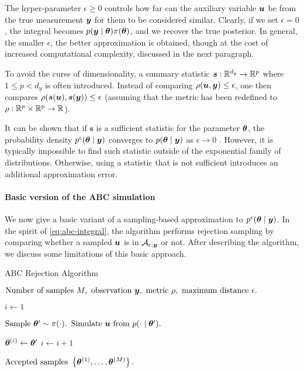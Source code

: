 The hyper-parameter $\epsilon \geq 0$ controls how far can the auxiliary variable $\bm{u}$ be from the true measurement $\bm{y}$ for them to be considered similar. Clearly, if we set $\epsilon = 0$, the integral becomes $p(\bm{y} \mid \bm{\theta}) \pi(\bm{\theta})$, and we recover the true posterior. In general, the smaller $\epsilon$, the better approximation is obtained, though at the cost of increased computational complexity, discussed in the next paragraph.

To avoid the curse of dimensionality, a summary statistic $\bm{s}: \mathbb{R}^{d_y} \to \mathbb{R}^p$ where $1 \leq p < d_y$ is often introduced. Instead of comparing $\rho(\bu, \by) \leq \epsilon$, one then compares $\rho(\bm{s}(\bm{u}), \bm{s}(\bm{y})) \leq \epsilon$ (assuming that the metric has been redefined to $\rho: \mathbb{R}^p \times \mathbb{R}^p \to \mathbb{R}$).

It can be shown that if $\bm{s}$ is a sufficient statistic for the parameter $\bm{\theta}$, the probability density $p^\epsilon(\bm{\theta} \mid \bm{y})$ converges to $p(\bm{\theta} \mid \bm{y})$ as $\epsilon \to 0$ \citep{jasra-time-series}. However, it is typically impossible to find such statistic outside of the exponential family of distributions. Otherwise, using a statistic that is not sufficient introduces an additional approximation error.

\paragraph{Basic version of the ABC simulation}
We now give a basic variant of a sampling-based approximation to $p^\epsilon(\bm{\theta} \mid \bm{y})$. In the spirit of \eqref{eq:abc-integral}, the algorithm performs rejection sampling by comparing whether a sampled $\bm{u}$ is in $\mathcal{A}_{\epsilon, \bm{y}}$ or not. After describing the algorithm, we discuss some limitations of this basic approach.
\begin{algorithm}[ht]
    \caption{ABC Rejection Algorithm}
    \label{alg:abc-rejection}
    \begin{algorithmic}[1]
        \Input $\text{Number of samples } M, \text{ observation } \bm{y}, \text{ metric } \rho, \text{ maximum distance } \epsilon.$
        
        \State $i \gets 1$
        
        \State $\text{Sample } \bm{\theta}^\prime \sim \pi(\cdot).$ 
        \State $\text{Simulate } \bm{u} \text{ from } p(\cdot \mid \bm{\theta}^\prime).$ 
        
        \If {$\rho(\bu, \by) \leq \epsilon$}
        \State $\bm{\theta}^{(i)} \gets \bm{\theta}^\prime$ 
        \State $i \gets i + 1$
        \EndIf
        \EndWhile
        
        \Output $\text{Accepted samples } \left\{ \bm{\theta}^{(1)}, \ldots, \bm{\theta}^{(M)} \right\}.$
    \end{algorithmic}
\end{algorithm}

